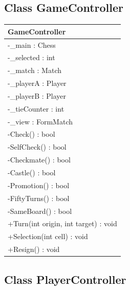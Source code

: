 \documentclass[12pt]{article}
\begin{document}
\subsection{Class GameController}

\begin{table}[H]
    \begin{tabular}{|l|}
    \hline
    \rowcolor[HTML]{C0C0C0} 
    \textbf{GameController}              \\ \hline
    \rowcolor[HTML]{EFEFEF} 
    -\_main : Chess                      \\ \hline
    \rowcolor[HTML]{EFEFEF} 
    -\_selected : int                    \\ \hline
    \rowcolor[HTML]{EFEFEF} 
    -\_match : Match                     \\ \hline
    \rowcolor[HTML]{EFEFEF} 
    -\_playerA : Player                  \\ \hline
    \rowcolor[HTML]{EFEFEF} 
    -\_playerB : Player                  \\ \hline
    \rowcolor[HTML]{EFEFEF} 
    -\_tieCounter : int                  \\ \hline
    \rowcolor[HTML]{EFEFEF} 
    -\_view : FormMatch                  \\ \hline
    -Check() : bool                      \\ \hline
    -SelfCheck() : bool                  \\ \hline
    -Checkmate() : bool                  \\ \hline
    -Castle() : bool                     \\ \hline
    -Promotion() : bool                  \\ \hline
    -FiftyTurns() : bool                 \\ \hline
    -SameBoard() : bool                  \\ \hline
    +Turn(int origin, int target) : void \\ \hline
    +Selection(int cell) : void          \\ \hline
    +Resign() : void                     \\ \hline
    \end{tabular}
\end{table}



\newpage


\subsection{Class PlayerController}
\end{document}
